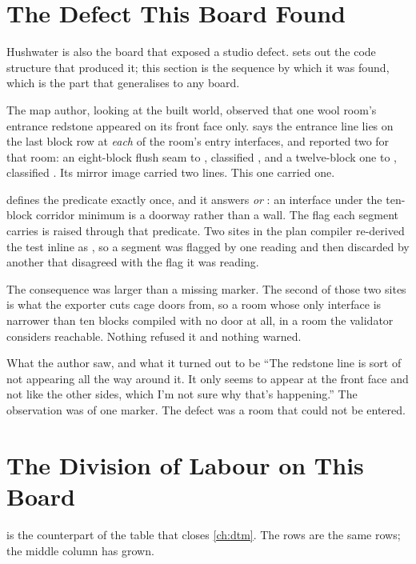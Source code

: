 \section{The Defect This Board Found}

Hushwater is also the board that exposed a studio defect.
 sets out the code structure that produced it; this section is
the sequence by which it was found, which is the part that generalises to any
board.

The map author, looking at the built world, observed that one wool room's
entrance redstone appeared on its front face only.  says the entrance
line lies on the last block row at \emph{each} of the room's entry interfaces,
and  reported two for that room: an eight-block flush
seam to , classified , and a twelve-block one to
, classified . Its mirror image carried two lines. This
one carried one.

 defines the predicate exactly once, and it answers 
\emph{or} : an interface under the ten-block corridor minimum is a
doorway rather than a wall. The  flag each segment carries is
raised through that predicate. Two sites in the plan compiler re-derived the
test inline as , so a segment was flagged by one
reading and then discarded by another that disagreed with the flag it was
reading.

The consequence was larger than a missing marker. The second of those two sites
is what the exporter cuts cage doors from, so a room whose only interface is
narrower than ten blocks compiled with no door at all, in a room the validator
considers reachable. Nothing refused it and nothing warned.

\begin{ruling}{What the author saw, and what it turned out to be}
``The redstone line is sort of not appearing all the way around it. It only
seems to appear at the front face and not like the other sides, which I'm not
sure why that's happening.'' The observation was of one marker. The defect was a
room that could not be entered.
\end{ruling}

\section{The Division of Labour on This Board}

 is the counterpart of the table that closes
\cref{ch:dtm}. The rows are the same rows; the middle column has grown.

